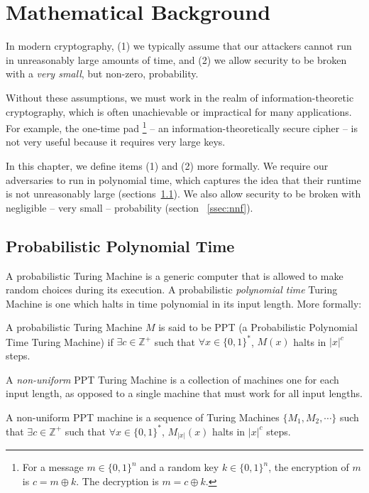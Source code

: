 \chapter{Mathematical Background}
\label{sec:mb}

In modern cryptography, (1) we typically assume that our attackers cannot run in unreasonably large amounts of time, and (2) we allow security to be broken with a \emph{very small}, but non-zero, probability.

Without these assumptions, we must work in the realm of information-theoretic cryptography, which is often unachievable or impractical for many applications. For example, the one-time pad
\footnote{For a message $m \in \{0,1\}^n$ and a random key $k \in \{0,1\}^n$, the encryption of $m$ is $c = m \oplus k$. The decryption is $m = c \oplus k$.}
-- an information-theoretically secure cipher -- is not very useful because it requires very large keys.

In this chapter, we define items (1) and (2) more formally. We require our adversaries to run in polynomial time, which captures the idea that their runtime is not unreasonably large (sections~\ref{ssec:ppt}). We also allow security to be broken with negligible -- very small -- probability (section ~\ref{ssec:nnf}). 


\section{Probabilistic Polynomial Time}
\label{ssec:ppt}
A probabilistic Turing Machine is a generic computer that is allowed to make random choices during its execution. A probabilistic \textit{polynomial time} Turing Machine is one which halts in time polynomial in its input length. More formally:

\begin{definition}
A probabilistic Turing Machine $M$ is said to be PPT (a Probabilistic Polynomial Time Turing Machine) if $\exists c \in \mathbb{Z}^+$ such that $\forall x \in\{0,1\}^*$, $M(x)$ halts in $|x|^c$ steps.
\end{definition}

A {\em non-uniform} PPT Turing Machine is a collection of machines one for each input length, as opposed to a single machine that must work for all input lengths.

\begin{definition}
A non-uniform PPT machine is a sequence of Turing Machines $\{ M_1, M_2, \cdots \}$ such that $\exists c \in \mathbb{Z}^+$ such that $\forall x \in\{0,1\}^*$, $M_{|x|}(x)$ halts in $|x|^c$ steps.
\end{definition}



